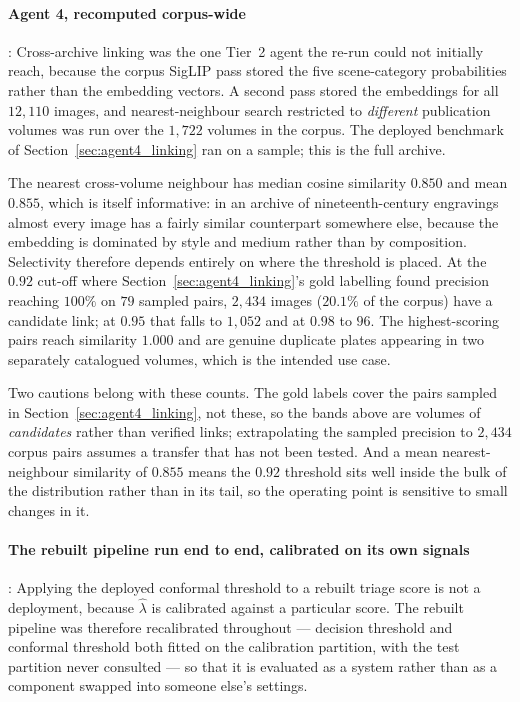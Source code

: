 \documentclass[12pt,a4paper]{report}
\begin{document}
\begin{enumerate}
\paragraph{Agent 4, recomputed corpus-wide}: Cross-archive linking was the one Tier~2 agent the
re-run could not initially reach, because the corpus SigLIP pass stored the five scene-category
probabilities rather than the embedding vectors. A second pass stored the embeddings for all
$12{,}110$ images, and nearest-neighbour search restricted to \emph{different} publication volumes
was run over the $1{,}722$ volumes in the corpus. The deployed benchmark of
Section~\ref{sec:agent4_linking} ran on a sample; this is the full archive.

The nearest cross-volume neighbour has median cosine similarity $0.850$ and mean $0.855$, which is
itself informative: in an archive of nineteenth-century engravings almost every image has a fairly
similar counterpart somewhere else, because the embedding is dominated by style and medium rather
than by composition. Selectivity therefore depends entirely on where the threshold is placed. At
the $0.92$ cut-off where Section~\ref{sec:agent4_linking}'s gold labelling found precision
reaching $100\%$ on $79$ sampled pairs, $2{,}434$ images ($20.1\%$ of the corpus) have a candidate
link; at $0.95$ that falls to $1{,}052$ and at $0.98$ to $96$. The highest-scoring pairs reach
similarity $1.000$ and are genuine duplicate plates appearing in two separately catalogued
volumes, which is the intended use case.

Two cautions belong with these counts. The gold labels cover the pairs sampled in
Section~\ref{sec:agent4_linking}, not these, so the bands above are volumes of \emph{candidates}
rather than verified links; extrapolating the sampled precision to $2{,}434$ corpus pairs assumes a
transfer that has not been tested. And a mean nearest-neighbour similarity of $0.855$ means the
$0.92$ threshold sits well inside the bulk of the distribution rather than in its tail, so the
operating point is sensitive to small changes in it.

\paragraph{The rebuilt pipeline run end to end, calibrated on its own signals}: Applying the
deployed conformal threshold to a rebuilt triage score is not a deployment, because $\hat\lambda$
is calibrated against a particular score. The rebuilt pipeline was therefore recalibrated
throughout --- decision threshold and conformal threshold both fitted on the calibration
partition, with the test partition never consulted --- so that it is evaluated as a system rather
than as a component swapped into someone else's settings.


\end{enumerate}
\end{document}
